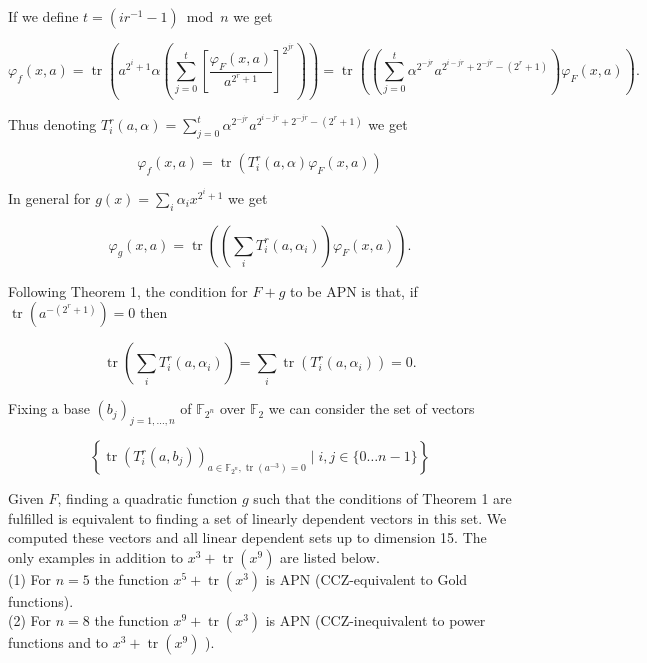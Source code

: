 \documentclass[10pt]{article}
\begin{document}
If we define $t=\left(i r^{-1}-1\right) \bmod n$ we get

$$
\varphi_{f}(x, a)=\operatorname{tr}\left(a^{2^{i}+1} \alpha\left(\sum_{j=0}^{t}\left[\frac{\varphi_{F}(x, a)}{a^{2^{r}+1}}\right]^{2^{j r}}\right)\right)=\operatorname{tr}\left(\left(\sum_{j=0}^{t} \alpha^{2^{-j r}} a^{2^{i-j r}+2^{-j r}-\left(2^{r}+1\right)}\right) \varphi_{F}(x, a)\right) .
$$

Thus denoting $T_{i}^{r}(a, \alpha)=\sum_{j=0}^{t} \alpha^{2^{-j r}} a^{2^{i-j r}+2^{-j r}-\left(2^{r}+1\right)}$ we get

$$
\varphi_{f}(x, a)=\operatorname{tr}\left(T_{i}^{r}(a, \alpha) \varphi_{F}(x, a)\right)
$$

In general for $g(x)=\sum_{i} \alpha_{i} x^{2^{i}+1}$ we get

$$
\varphi_{g}(x, a)=\operatorname{tr}\left(\left(\sum_{i} T_{i}^{r}\left(a, \alpha_{i}\right)\right) \varphi_{F}(x, a)\right) .
$$

Following Theorem 1, the condition for $F+g$ to be APN is that, if $\operatorname{tr}\left(a^{-\left(2^{r}+1\right)}\right)=0$ then

$$
\operatorname{tr}\left(\sum_{i} T_{i}^{r}\left(a, \alpha_{i}\right)\right)=\sum_{i} \operatorname{tr}\left(T_{i}^{r}\left(a, \alpha_{i}\right)\right)=0 .
$$

Fixing a base $\left(b_{j}\right)_{j=1, \ldots, n}$ of $\mathbb{F}_{2^{n}}$ over $\mathbb{F}_{2}$ we can consider the set of vectors

$$
\left\{\operatorname{tr}\left(T_{i}^{r}\left(a, b_{j}\right)\right)_{a \in \mathbb{F}_{2^{n}}, \operatorname{tr}\left(a^{-3}\right)=0} \mid i, j \in\{0 \ldots n-1\}\right\}
$$

Given $F$, finding a quadratic function $g$ such that the conditions of Theorem 1 are fulfilled is equivalent to finding a set of linearly dependent vectors in this set. We computed these vectors and all linear dependent sets up to dimension 15. The only examples in addition to $x^{3}+\operatorname{tr}\left(x^{9}\right)$ are listed below.\\
(1) For $n=5$ the function $x^{5}+\operatorname{tr}\left(x^{3}\right)$ is APN (CCZ-equivalent to Gold functions).\\
(2) For $n=8$ the function $x^{9}+\operatorname{tr}\left(x^{3}\right)$ is APN (CCZ-inequivalent to power functions and to $x^{3}+\operatorname{tr}\left(x^{9}\right)$ ).
\end{document}
